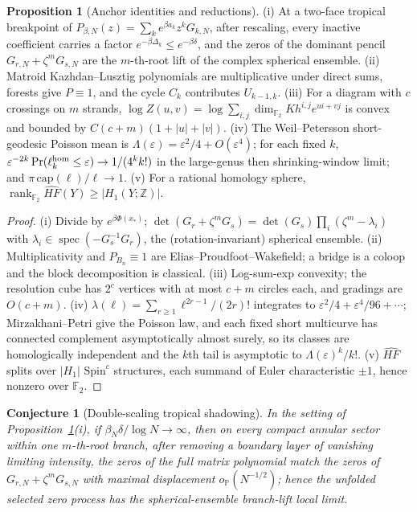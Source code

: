 \documentclass[11pt]{article}
\newtheorem{conjecture}{Conjecture}
\theoremstyle{definition}
\newcommand{\Pp}{\mathbb P}
\newcommand{\Z}{\mathbb Z}
\providecommand{\Z}{\mathbb Z}
\providecommand{\Pp}{\mathbb P}
\newtheorem{proposition}{Proposition}
\begin{document}
\begin{proposition}[Anchor identities and reductions]\label{aq:basic}
{\rm(i)} At a two-face tropical breakpoint of $P_{\beta,N}(z)=\sum_ke^{\beta a_k}z^kG_{k,N}$, after rescaling, every inactive coefficient carries a factor $e^{-\beta\Delta_k}\le e^{-\beta\delta}$, and the zeros of the dominant pencil $G_{r,N}+\zeta^mG_{s,N}$ are the $m$-th-root lift of the complex spherical ensemble.  {\rm(ii)} Matroid Kazhdan--Lusztig polynomials are multiplicative under direct sums, forests give $P\equiv1$, and the cycle $C_k$ contributes $U_{k-1,k}$.  {\rm(iii)} For a diagram with $c$ crossings on $m$ strands, $\log Z(u,v)=\log\sum_{i,j}\dim_{\mathbb F_2}Kh^{i,j}e^{ui+vj}$ is convex and bounded by $C(c+m)(1+|u|+|v|)$.  {\rm(iv)} The Weil--Petersson short-geodesic Poisson mean is $\Lambda(\varepsilon)=\varepsilon^2/4+O(\varepsilon^4)$; for each fixed $k$, $\varepsilon^{-2k}\Pr(\ell_k^{\rm hom}\le\varepsilon)\to1/(4^kk!)$ in the large-genus then shrinking-window limit; and $\pi\,\mathrm{cap}(\ell)/\ell\to1$.  {\rm(v)} For a rational homology sphere, $\operatorname{rank}_{\mathbb F_2}\widehat{HF}(Y)\ge|H_1(Y;\Z)|$.
\end{proposition}

\begin{proof}
{\rm(i)} Divide by $e^{\beta\Phi(x_*)}$; $\det(G_r+\zeta^mG_s)=\det(G_s)\prod_i(\zeta^m-\lambda_i)$ with $\lambda_i\in\operatorname{spec}(-G_s^{-1}G_r)$, the (rotation-invariant) spherical ensemble.  {\rm(ii)} Multiplicativity and $P_{B_n}\equiv1$ are Elias--Proudfoot--Wakefield; a bridge is a coloop and the block decomposition is classical.  {\rm(iii)} Log-sum-exp convexity; the resolution cube has $2^c$ vertices with at most $c+m$ circles each, and gradings are $O(c+m)$.  {\rm(iv)} $\lambda(\ell)=\sum_{r\ge1}\ell^{2r-1}/(2r)!$ integrates to $\varepsilon^2/4+\varepsilon^4/96+\cdots$; Mirzakhani--Petri give the Poisson law, and each fixed short multicurve has connected complement asymptotically almost surely, so its classes are homologically independent and the $k$th tail is asymptotic to $\Lambda(\varepsilon)^k/k!$.  {\rm(v)} $\widehat{HF}$ splits over $|H_1|$ $\mathrm{Spin}^c$ structures, each summand of Euler characteristic $\pm1$, hence nonzero over $\mathbb F_2$.
\end{proof}

\begin{conjecture}[Double-scaling tropical shadowing]\label{aq1}
In the setting of Proposition~\ref{aq:basic}(i), if $\beta_N\delta/\log N\to\infty$, then on every compact annular sector within one $m$-th-root branch, after removing a boundary layer of vanishing limiting intensity, the zeros of the full matrix polynomial match the zeros of $G_{r,N}+\zeta^mG_{s,N}$ with maximal displacement $o_{\Pp}(N^{-1/2})$; hence the unfolded selected zero process has the spherical-ensemble branch-lift local limit.
\end{conjecture}
\end{document}
